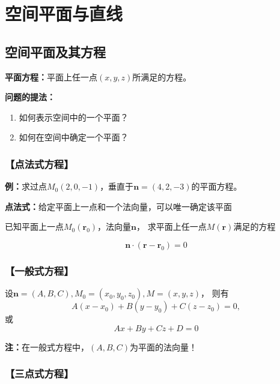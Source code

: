 \section{空间平面与直线}

\subsection{空间平面及其方程}

{\bf 平面方程：}平面上任一点$(x,y,z)$所满足的方程。

{\bf 问题的提法：}
\begin{enumerate}[(1)]
  \setlength{\itemindent}{1cm}
  \item 如何表示空间中的一个平面？
  \item 如何在空间中确定一个平面？
\end{enumerate}


\subsubsection{【点法式方程】}

{\bf 例：}求过点$M_0(2,0,-1)$，垂直于$\bm{n}=(4,2,-3)$的平面方程。

{\bf 点法式：}给定平面上一点和一个法向量，可以唯一确定该平面

已知平面上一点$M_0(\bm{r}_0)$，法向量$\bm{n}$，
求平面上任一点$M(\bm{r})$满足的方程 
	
$$\bm{n}\cdot(\bm{r}-\bm{r}_0)=0$$ 

\subsubsection{【一般式方程】}

设$\bm{n}=(A,B,C),M_0=(x_0,y_0,z_0),M=(x,y,z)$， 则有
$$A(x-x_0)+B(y-y_0)+C(z-z_0)=0,$$
或 
$$Ax+By+Cz+D=0$$ 

{\bf 注：}在一般式方程中，$(A,B,C)$为平面的法向量！

\subsubsection{【三点式方程】}

